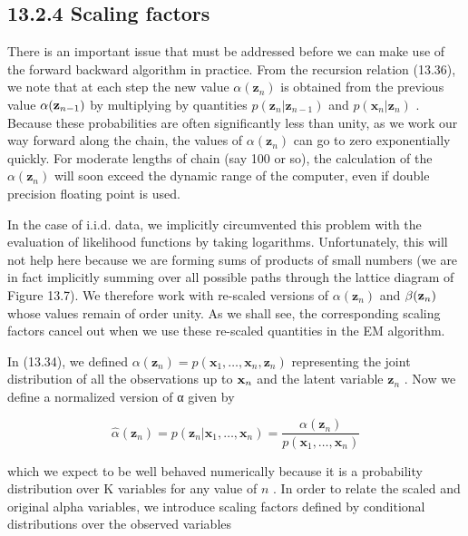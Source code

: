 \documentclass[
  10
]{article}
\begin{document}
\subsection{13.2.4 Scaling factors}\label{scaling-factors}

There is an important issue that must be addressed before we can make
use of the forward backward algorithm in practice. From the recursion
relation (13.36), we note that at each step the new value
\(\alpha ( { \mathbf z } _ { n } )\) is obtained from the previous value
\(\alpha ( { \bf z } _ { n - 1 } )\) by multiplying by quantities
\(p ( \mathbf { z } _ { n } | \mathbf { z } _ { n - 1 } )\) and
\(p ( \mathbf { x } _ { n } | \mathbf { z } _ { n } )\) . Because these
probabilities are often significantly less than unity, as we work our
way forward along the chain, the values of
\(\alpha ( { \mathbf z } _ { n } )\) can go to zero exponentially
quickly. For moderate lengths of chain (say 100 or so), the calculation
of the \(\alpha ( { \mathbf z } _ { n } )\) will soon exceed the dynamic
range of the computer, even if double precision floating point is used.

In the case of i.i.d. data, we implicitly circumvented this problem with
the evaluation of likelihood functions by taking logarithms.
Unfortunately, this will not help here because we are forming sums of
products of small numbers (we are in fact implicitly summing over all
possible paths through the lattice diagram of Figure 13.7). We therefore
work with re-scaled versions of \(\alpha ( { \mathbf z } _ { n } )\) and
\(\beta ( { \bf z } _ { n } )\) whose values remain of order unity. As
we shall see, the corresponding scaling factors cancel out when we use
these re-scaled quantities in the EM algorithm.

In (13.34), we defined
\(\alpha ( { \mathbf z } _ { n } ) = p ( { \mathbf x } _ { 1 } , \ldots , { \mathbf x } _ { n } , { \mathbf z } _ { n } )\)
representing the joint distribution of all the observations up to
\({ \bf x } _ { n }\) and the latent variable \(\mathbf { z } _ { n }\)
. Now we define a normalized version of α given by

\[
\widehat {\alpha} (\mathbf {z} _ {n}) = p (\mathbf {z} _ {n} | \mathbf {x} _ {1}, \ldots , \mathbf {x} _ {n}) = \frac {\alpha (\mathbf {z} _ {n})}{p (\mathbf {x} _ {1} , \ldots , \mathbf {x} _ {n})}\tag{13.55}
\]

which we expect to be well behaved numerically because it is a
probability distribution over K variables for any value of \(n\) . In
order to relate the scaled and original alpha variables, we introduce
scaling factors defined by conditional distributions over the observed
variables
\end{document}
